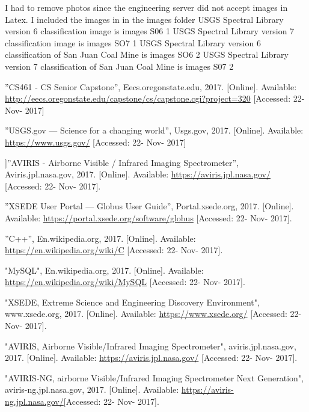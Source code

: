 \documentclass[onecolumn, draftclsnofoot,10pt, compsoc]{IEEEtran}
\begin{document}
I had to remove photos since the engineering server did not accept images in Latex.
\newline
I included the images in in the images folder
\newline
USGS Spectral Library version 6 classification image is images S06 1
\newline
USGS Spectral Library version 7 classification image is images SO7 1
\newline
USGS Spectral Library version 6 classification of San Juan Coal Mine is images SO6 2
\newline
USGS Spectral Library version 7 classification of San Juan Coal Mine is images S07 2

\begin{thebibliography}{9}
 ”CS461 - CS Senior Capstone”, Eecs.oregonstate.edu, 2017. [Online]. Available: \url{http://eecs.oregonstate.edu/capstone/cs/capstone.cgi?project=320} [Accessed: 22- Nov- 2017]

 ”USGS.gov — Science for a changing world”, Usgs.gov, 2017. [Online]. Available: \url{https://www.usgs.gov/} [Accessed: 22- Nov- 2017]

 ]”AVIRIS - Airborne Visible / Infrared Imaging Spectrometer”, Aviris.jpl.nasa.gov, 2017. [Online]. Available:
\url{https://aviris.jpl.nasa.gov/} [Accessed: 22- Nov- 2017].

 ”XSEDE User Portal — Globus User Guide”, Portal.xsede.org, 2017. [Online]. Available: \url{https://portal.xsede.org/software/globus} [Accessed: 22- Nov- 2017].

 ”C++”, En.wikipedia.org, 2017. [Online]. Available:
\url{https://en.wikipedia.org/wiki/C} [Accessed: 22- Nov- 2017].

 "MySQL", En.wikipedia.org, 2017. [Online]. Available: \url{https://en.wikipedia.org/wiki/MySQL} [Accessed: 22- Nov- 2017].

 "XSEDE, Extreme Science and Engineering Discovery Environment", www.xsede.org, 2017. [Online]. Available: \url{https://www.xsede.org/} [Accessed: 22- Nov- 2017].

 "AVIRIS, Airborne Visible/Infrared Imaging Spectrometer", aviris.jpl.nasa.gov, 2017. [Online]. Available: \url{https://aviris.jpl.nasa.gov/} [Accessed: 22- Nov- 2017].

 "AVIRIS-NG, airborne Visible/Infrared Imaging Spectrometer Next Generation", aviris-ng.jpl.nasa.gov, 2017. [Online]. Available: \url{https://aviris-ng.jpl.nasa.gov/}[Accessed: 22- Nov- 2017].


\end{thebibliography}
\end{document}
